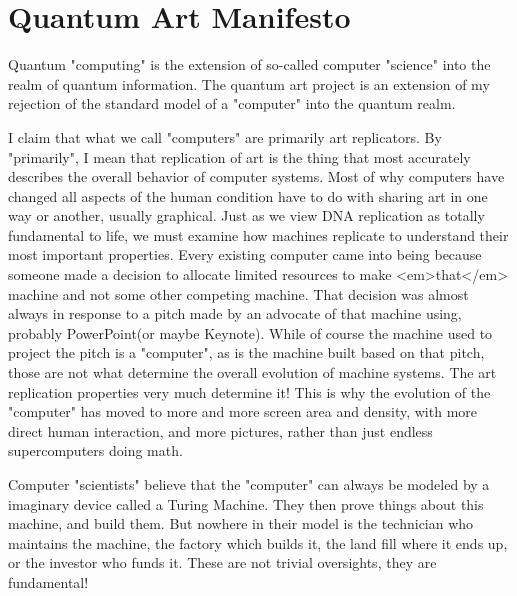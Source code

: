 \documentclass[11pt]{article}
\begin{document}
\section{
Quantum Art Manifesto}




Quantum "computing" is the extension of so-called computer "science" into the realm of quantum information.  The quantum art project is an extension of my rejection of the standard model of a "computer" into the quantum realm.




    I claim that what we call "computers" are primarily art replicators.  By "primarily", I mean that replication of art is the thing that most accurately describes the overall behavior of computer systems.  Most of why computers have changed all aspects of the human condition have to do with sharing art in one way or another, usually graphical.  Just as we view DNA replication as totally fundamental to life, we must examine how machines replicate to understand their most important properties.  Every existing computer came into being because someone made a decision to allocate limited resources to make <em>that</em> machine and not some other competing machine.  That decision was almost always in response to a pitch made by an advocate of that machine using, probably PowerPoint(or maybe Keynote).  While of course the machine used to project the pitch is a "computer", as is the machine built based on that pitch, those are not what determine the overall evolution of machine systems.  The art replication properties very much determine it!  This is why the evolution of the "computer" has moved to more and more screen area and density, with more direct human interaction, and more pictures, rather than just endless supercomputers doing math. 




    Computer "scientists" believe that the "computer" can always be modeled by a imaginary device called a Turing Machine.  They then prove things about this machine, and build them. But nowhere in their model is the technician who maintains the machine, the factory which builds it, the land fill where it ends up, or the investor who funds it.  These are not trivial oversights, they are fundamental! 
    
        
    
\end{document}
